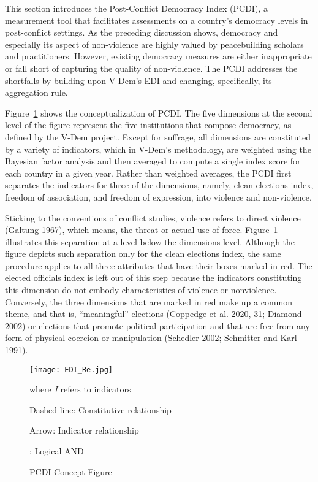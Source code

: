 \documentclass [11pt]{article}
\begin{document}
This section introduces the Post-Conflict Democracy Index (PCDI), a measurement tool that facilitates assessments on a country's democracy levels in post-conflict settings. As the preceding discussion shows, democracy and especially its aspect of non-violence are highly valued by peacebuilding scholars and practitioners. However, existing democracy measures are either inappropriate or fall short of capturing the quality of non-violence. The PCDI addresses the shortfalls by building upon V-Dem's EDI and changing, specifically, its aggregation rule.

Figure~\ref{fig3} shows the conceptualization of PCDI. The five dimensions at the second level of the figure represent the five institutions that compose democracy, as defined by the V-Dem project. Except for suffrage, all dimensions are constituted by a variety of indicators, which in V-Dem's methodology, are weighted using the Bayesian factor analysis and then averaged to compute a single index score for each country in a given year. Rather than weighted averages, the PCDI first separates the indicators for three of the dimensions, namely, clean elections index, freedom of association, and freedom of expression, into violence and non-violence.

Sticking to the conventions of conflict studies, violence refers to direct violence (Galtung 1967), which means, the threat or actual use of force. Figure~\ref{fig3} illustrates this separation at a level below the dimensions level. Although the figure depicts such separation only for the clean elections index, the same procedure applies to all three attributes that have their boxes marked in red. The elected officials index is left out of this step because the indicators constituting this dimension do not embody characteristics of violence or nonviolence. Conversely, the three dimensions that are marked in red make up a common theme, and that is, ``meaningful'' elections (Coppedge et al. 2020, 31; Diamond 2002) or elections that promote political participation and that are free from any form of physical coercion or manipulation (Schedler 2002; Schmitter and Karl 1991).

\begin{figure} [h!]
\caption{PCDI Concept Figure}
\label{fig3}%
\begin{center} 
\small
 \texttt{[image: EDI\_Re.jpg]}
 
\footnotesize{where \emph{I} refers to indicators}

{\footnotesize Dashed line: Constitutive relationship}

{\footnotesize Arrow: Indicator relationship}

{\footnotesize * : Logical AND}
\end{center}
\end{figure}
\end{document}
